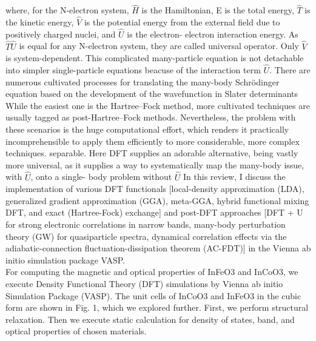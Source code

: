 \documentclass[12pt, letterpaper]{article}
\newcommand*{\1}{\hspace{1pt}}
\begin{document}
    where, for the N-electron system, $\hat{H}$ is the Hamiltonian, E is the total energy, $\hat{T}$ is the kinetic energy, $\hat{V}$
    is the potential energy from the external field due to positively charged nuclei, and $\hat{U}$ is the electron-
    electron interaction energy. As $\hat{T} \hat{U}$ is equal for any N-electron system, they are called universal operator.
    Only $\hat{V}$ is system-dependent. This complicated many-particle equation is not detachable
    into simpler single-particle equations beacuse of the interaction term $\hat{U}$.
    There are numerous cultivated processes for translating the many-body 
    Schrödinger equation based on the development of the wavefunction in Slater determinants While the easiest one is the Hartree–Fock method, more cultivated techniques are usually tagged as post-Hartree–Fock
    methods. Nevertheless, the problem with these scenarios is the huge 
    computational effort, which renders it practically incomprehensible to apply them 
    efficiently to more considerable, more complex techniques.
    separable. Here DFT supplies an adorable alternative, being vastly more universal, 
    as it supplies a way to systematically map the many-body issue, with $\hat{U}$, onto a single-
    body problem without $\hat{U}$
    In this review, I discuss the implementation of various DFT functionals [local-density approximation (LDA), generalized gradient approximation (GGA), 
    meta-GGA, hybrid functional mixing DFT, and exact (Hartree-Fock) exchange] and post-DFT approaches 
    [DFT + U for strong electronic correlations in narrow bands, many-body perturbation theory (GW) for quasiparticle spectra, 
    dynamical correlation effects via the adiabatic-connection fluctuation-dissipation theorem (AC-FDT)] in the 
    Vienna ab initio simulation package VASP. \\ 

    For computing the magnetic and optical properties of InFeO3 and InCoO3, we execute Density Functional Theory (DFT)\cite{r5,r6,r7,r8} simulations by  Vienna ab initio Simulation 
    Package (VASP)\cite{r9,r10,r11}. The unit cells of InCoO3 and InFeO3 in the cubic form are shown in Fig. 1, which we explored further. First, we perform structural relaxation. 
    Then we execute static calculation for density of states, band, and optical properties of chosen materials. 
    
%
            
\end{document}
